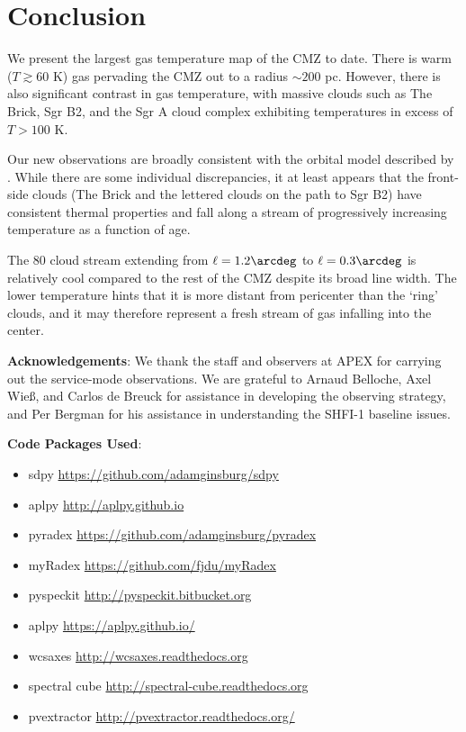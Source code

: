 \section{Conclusion}
We present the largest gas temperature map of the CMZ to date.  There is warm
($T\gtrsim60$ K) gas pervading the CMZ out to a radius $\sim200$ pc.  However,
there is also significant contrast in gas temperature, with massive clouds such
as The Brick, Sgr B2, and the Sgr A cloud complex exhibiting temperatures in
excess of $T>100$ K.

Our new observations are broadly consistent with the orbital model described by
\citet{Kruijssen2014d}.  While there are some individual discrepancies, it at
least appears that the front-side clouds (The Brick and the lettered clouds on
the path to Sgr B2) have consistent thermal properties and fall along a stream
of progressively increasing temperature as a function of age.  

The 80 \kms cloud stream extending from $\ell=1.2\arcdeg$ to $\ell=0.3\arcdeg$
is relatively cool compared to the rest of the CMZ despite its broad line
width.  The lower temperature hints that it is more distant from pericenter
than the `ring' clouds, and it may therefore represent a fresh stream of gas
infalling into the center.

\textbf{Acknowledgements}:
We thank the staff and observers at APEX for carrying out the service-mode
observations.  We are grateful to Arnaud Belloche, Axel Wieß, and Carlos de
Breuck for assistance in developing the observing strategy, and Per Bergman for
his assistance in understanding the SHFI-1 baseline issues.

\textbf{Code Packages Used}:

\begin{itemize}
    \item sdpy \url{https://github.com/adamginsburg/sdpy}
    \item aplpy \url{http://aplpy.github.io}
    \item pyradex \url{https://github.com/adamginsburg/pyradex}
    \item myRadex \url{https://github.com/fjdu/myRadex}
    \item pyspeckit \url{http://pyspeckit.bitbucket.org}
    \item aplpy \url{https://aplpy.github.io/}
    \item wcsaxes \url{http://wcsaxes.readthedocs.org}
    \item spectral cube \url{http://spectral-cube.readthedocs.org}
    \item pvextractor \url{http://pvextractor.readthedocs.org/}
\end{itemize}

